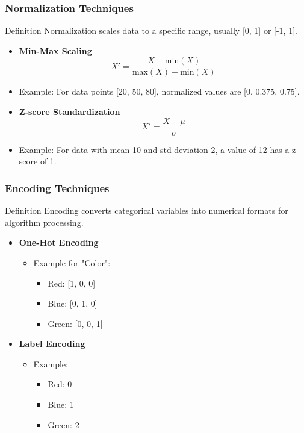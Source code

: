 \documentclass{beamer}
\begin{document}
\begin{frame}[fragile]
    \frametitle{Normalization Techniques}
    \begin{block}{Definition}
        Normalization scales data to a specific range, usually [0, 1] or [-1, 1].
    \end{block}
    
    \begin{itemize}
        \item \textbf{Min-Max Scaling}
        \begin{equation}
        X' = \frac{X - \text{min}(X)}{\text{max}(X) - \text{min}(X)}
        \end{equation}
        \item Example: For data points [20, 50, 80], normalized values are [0, 0.375, 0.75].
        
        \item \textbf{Z-score Standardization}
        \begin{equation}
        X' = \frac{X - \mu}{\sigma}
        \end{equation}
        \item Example: For data with mean 10 and std deviation 2, a value of 12 has a z-score of 1.
    \end{itemize}
\end{frame}

\begin{frame}[fragile]
    \frametitle{Encoding Techniques}
    \begin{block}{Definition}
        Encoding converts categorical variables into numerical formats for algorithm processing.
    \end{block}
    
    \begin{itemize}
        \item \textbf{One-Hot Encoding}
        \begin{itemize}
            \item Example for "Color":
            \begin{itemize}
                \item Red: [1, 0, 0]
                \item Blue: [0, 1, 0]
                \item Green: [0, 0, 1]
            \end{itemize}
        \end{itemize}
        
        \item \textbf{Label Encoding}
        \begin{itemize}
            \item Example:
            \begin{itemize}
                \item Red: 0
                \item Blue: 1
                \item Green: 2
            \end{itemize}
        \end{itemize}
    \end{itemize}
\end{frame}
\end{document}
